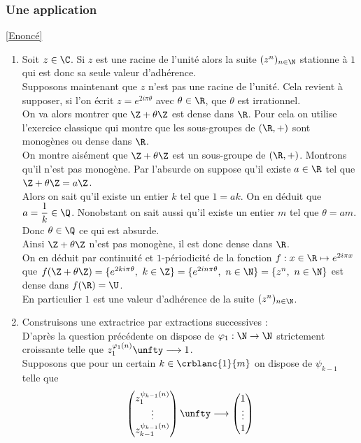 \documentclass{book}
\begin{document}
	\subsubsection{Une application }
	\label{sec:une-application}
	\textcolor{blue}{\hyperref[Une application]{[Enoncé]}}\\
	\begin{enumerate}
		\item Soit $z\in \C$. Si $z$ est une racine de l'unité alors la suite $(z^n)_{n\in \N}$ stationne à $1$ qui est donc sa seule valeur d'adhérence.\\
		Supposons maintenant que $z$ n'est pas une racine de l'unité. Cela revient à supposer, si l'on écrit $z=e^{2i\pi\theta}$ avec $\theta\in \R$, que $\theta$ est irrationnel.\\
		On va alors montrer que $\Z+\theta\Z$ est dense dans $\R$. Pour cela on utilise l'exercice classique qui montre que les sous-groupes de $(\R,+)$ sont monogènes ou dense dans $\R$.\\
		On montre aisément que $\Z+\theta\Z$ est un sous-groupe de $(\R,+)$. Montrons qu'il n'est pas monogène. Par l'absurde on suppose qu'il existe $a\in \R$ tel que $\Z+\theta\Z=a\Z$.\\
		Alors on sait qu'il existe un entier $k$ tel que $1=ak$. On en déduit que $a=\displaystyle\frac{1}{k}\in \Q$. Nonobstant on sait aussi qu'il existe un entier $m$ tel que $\theta=am$. Donc $\theta\in \Q$ ce qui est absurde.\\
		Ainsi $\Z+\theta\Z$ n'est pas monogène, il est donc dense dans $\R$.\\
		On en déduit par continuité et $1$-périodicité de la fonction $f:x\in \R\mapsto e^{2i\pi x}$ que $f(\Z+\theta\Z)=\{e^{2ki\pi\theta},\ k\in \Z\}=\{e^{2in\pi\theta},\ n\in \N\}=\{z^n,\ n\in \N\}$ est dense dans $f(\R)=\U$.\\
		En particulier $1$ est une valeur d'adhérence de la suite $(z^n)_{n\in \N}$.
		\item Construisons une extractrice par extractions successives :\\
		D'après la question précédente on dispose de $\varphi_1:\N\to\N$ strictement croissante telle que $z_1^{\varphi_1(n)}\unfty\longrightarrow1$.\\
		Supposons que pour un certain $k\in \crblanc{1}{m}$ on dispose de $\psi_{k-1}$ telle que $$\begin{pmatrix}z_1^{\psi_{k-1}(n)}\\\vdots\\z_{k-1}^{\psi_{k-1}(n)}\end{pmatrix}\unfty\longrightarrow\begin{pmatrix}1\\\vdots\\1\end{pmatrix}$$

\end{enumerate}
\end{document}
